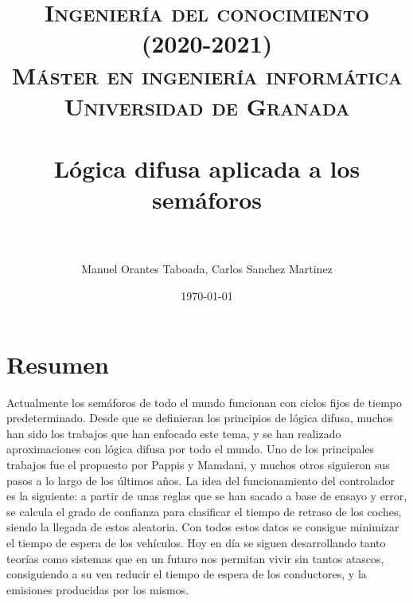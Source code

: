 
\usepackage{booktabs}
\usepackage{tabularx}
\usepackage{multicol} 



\title{
\normalfont \normalsize 
\textsc{\textbf{Ingeniería del conocimiento (2020-2021)} \\ Máster en ingeniería informática \\ Universidad de Granada} \\ [25pt] %
\horrule{0.5pt} \\[0.4cm] %
\huge Lógica difusa aplicada a los semáforos \\ %
\horrule{2pt} \\[0.5cm] %
}
\author{Manuel Orantes Taboada, Carlos Sanchez Martinez} %


\date{\normalsize\today} %




\maketitle %

\newpage %

\tableofcontents %

\newpage

\section{Resumen}
Actualmente los semáforos de todo el mundo funcionan con ciclos fijos de tiempo predeterminado. Desde que se definieran los principios de lógica difusa, muchos han sido los trabajos que han enfocado este tema, y se han realizado aproximaciones con lógica difusa por todo el mundo. Uno de los principales trabajos fue el propuesto por Pappis y Mamdani, y muchos otros siguieron sus pasos a lo largo de los últimos años. La idea del funcionamiento del controlador es la siguiente: a partir de unas reglas que se han sacado a base de ensayo y error, se calcula el grado de confianza para clasificar el tiempo de retraso de los coches, siendo la llegada de estos aleatoria. Con todos estos datos se consigue minimizar el tiempo de espera de los vehículos. Hoy en día se siguen desarrollando tanto teorías como sistemas que en un futuro nos permitan vivir sin tantos atascos, consiguiendo a su ven reducir el tiempo de espera de los conductores, y la emisiones producidas por los mismos.

